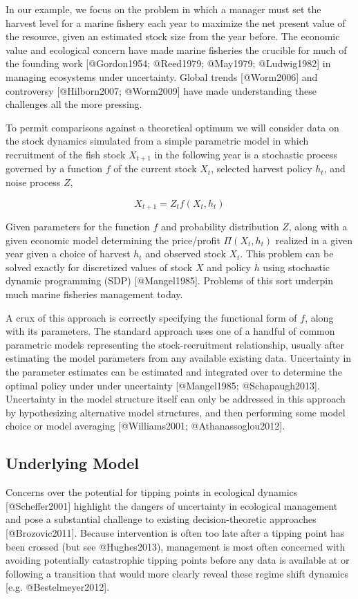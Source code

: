 \documentclass[author-year, review]{elsarticle} %
\begin{document}
In our example, we focus on the problem in which a manager must set the
harvest level for a marine fishery each year to maximize the net present
value of the resource, given an estimated stock size from the year
before. The economic value and ecological concern have made marine
fisheries the crucible for much of the founding work {[}@Gordon1954;
@Reed1979; @May1979; @Ludwig1982{]} in managing ecosystems under
uncertainty. Global trends {[}@Worm2006{]} and controversy
{[}@Hilborn2007; @Worm2009{]} have made understanding these challenges
all the more pressing.

To permit comparisons against a theoretical optimum we will consider
data on the stock dynamics simulated from a simple parametric model in
which recruitment of the fish stock $X_{t+1}$ in the following year is a
stochastic process governed by a function $f$ of the current stock
$X_t$, selected harvest policy $h_t$, and noise process $Z$,

\[X_{t+1} = Z_t f(X_t, h_t) \]

Given parameters for the function $f$ and probability distribution $Z$,
along with a given economic model determining the price/profit
$\Pi(X_t, h_t)$ realized in a given year given a choice of harvest $h_t$
and observed stock $X_t$. This problem can be solved exactly for
discretized values of stock $X$ and policy $h$ using stochastic dynamic
programming (SDP) {[}@Mangel1985{]}. Problems of this sort underpin much
marine fisheries management today.

A crux of this approach is correctly specifying the functional form of
$f$, along with its parameters. The standard approach uses one of a
handful of common parametric models representing the stock-recruitment
relationship, usually after estimating the model parameters from any
available existing data. Uncertainty in the parameter estimates can be
estimated and integrated over to determine the optimal policy under
under uncertainty {[}@Mangel1985; @Schapaugh2013{]}. Uncertainty in the
model structure itself can only be addressed in this approach by
hypothesizing alternative model structures, and then performing some
model choice or model averaging {[}@Williams2001; @Athanassoglou2012{]}.

\subsection{Underlying Model}

Concerns over the potential for tipping points in ecological dynamics
{[}@Scheffer2001{]} highlight the dangers of uncertainty in ecological
management and pose a substantial challenge to existing
decision-theoretic approaches {[}@Brozovic2011{]}. Because intervention
is often too late after a tipping point has been crossed (but see
@Hughes2013), management is most often concerned with avoiding
potentially catastrophic tipping points before any data is available at
or following a transition that would more clearly reveal these regime
shift dynamics {[}e.g. @Bestelmeyer2012{]}.
\end{document}
